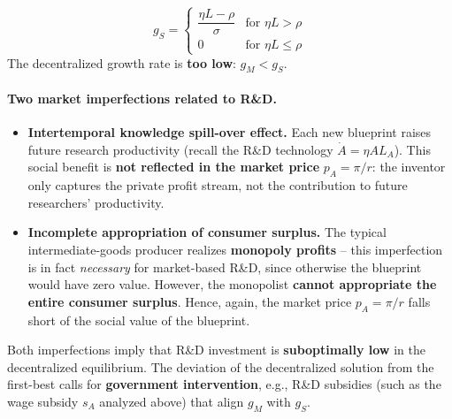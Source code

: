 \begin{tcolorbox}[
    colback=red!1!white,
    colframe=red!40!white,
    title=Key Result: Social Planner's Solution,
    fonttitle=\bfseries
    ]
\[
    g_S = \begin{cases} \dfrac{\eta L - \rho}{\sigma} & \text{for } \eta L > \rho \\[4pt] 0 & \text{for } \eta L \leq \rho \end{cases}
\]
The decentralized growth rate is \textbf{too low}: $g_M < g_S$.
\end{tcolorbox}

\paragraph{Two market imperfections related to R\&D.}
\begin{itemize}
    \item \textbf{Intertemporal knowledge spill-over effect.} Each new blueprint raises future research productivity (recall the R\&D technology $\dot{A} = \eta A L_A$). This social benefit is \textbf{not reflected in the market price} $p_A = \pi/r$: the inventor only captures the private profit stream, not the contribution to future researchers' productivity.
    \item \textbf{Incomplete appropriation of consumer surplus.} The typical intermediate-goods producer realizes \textbf{monopoly profits} -- this imperfection is in fact \textit{necessary} for market-based R\&D, since otherwise the blueprint would have zero value. However, the monopolist \textbf{cannot appropriate the entire consumer surplus}. Hence, again, the market price $p_A = \pi/r$ falls short of the social value of the blueprint.
\end{itemize}

\noindent Both imperfections imply that R\&D investment is \textbf{suboptimally low} in the decentralized equilibrium. The deviation of the decentralized solution from the first-best calls for \textbf{government intervention}, e.g., R\&D subsidies (such as the wage subsidy $s_A$ analyzed above) that align $g_M$ with $g_S$.
